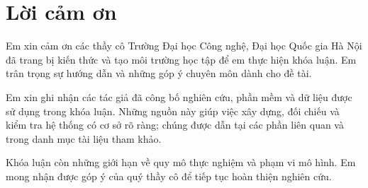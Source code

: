 \chapter*{Lời cảm ơn}

Em xin cảm ơn các thầy cô Trường Đại học Công nghệ, Đại học Quốc gia Hà Nội đã trang bị kiến
thức và tạo môi trường học tập để em thực hiện khóa luận. Em trân trọng sự hướng dẫn và
những góp ý chuyên môn dành cho đề tài.

Em xin ghi nhận các tác giả đã công bố nghiên cứu, phần mềm và dữ liệu được sử dụng trong
khóa luận. Những nguồn này giúp việc xây dựng, đối chiếu và kiểm tra hệ thống có cơ sở rõ
ràng; chúng được dẫn tại các phần liên quan và trong danh mục tài liệu tham khảo.

Khóa luận còn những giới hạn về quy mô thực nghiệm và phạm vi mô hình. Em mong nhận được
góp ý của quý thầy cô để tiếp tục hoàn thiện nghiên cứu.

\clearpage
